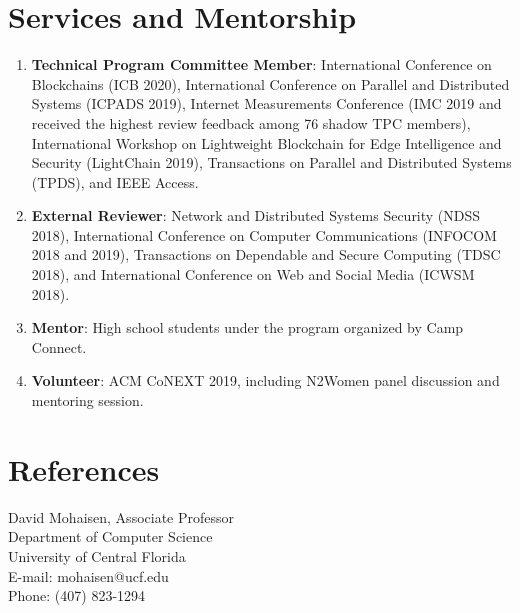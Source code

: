 \documentclass[10pt]{article}
\begin{document}
\vspace{-4mm}
\section*{\sc Services and Mentorship}
\begin{enumerate}
    \item \textbf{Technical Program Committee Member}: International Conference on Blockchains (ICB 2020), International Conference on Parallel and Distributed Systems (ICPADS 2019), Internet Measurements Conference (IMC 2019 and received the highest review feedback among 76 shadow TPC members), International Workshop on Lightweight Blockchain for Edge Intelligence and Security (LightChain 2019), Transactions on Parallel and Distributed Systems (TPDS),  and IEEE Access.
    \item \textbf{External Reviewer}: Network and Distributed Systems Security (NDSS 2018), International Conference on Computer Communications (INFOCOM 2018 and 2019), Transactions on Dependable and Secure Computing (TDSC 2018), and International Conference on Web and Social Media (ICWSM 2018).
    \item \textbf{Mentor}: High school students under the program organized by Camp Connect.
    \item \textbf{Volunteer}: ACM CoNEXT 2019, including N2Women panel discussion and mentoring session. 
\end{enumerate}
\vspace{-2mm}




\section*{\sc References}
David Mohaisen, Associate Professor\\
Department of Computer Science\\
University of Central Florida\\
E-mail: mohaisen@ucf.edu\\
Phone: (407) 823-1294\\
\end{document}
